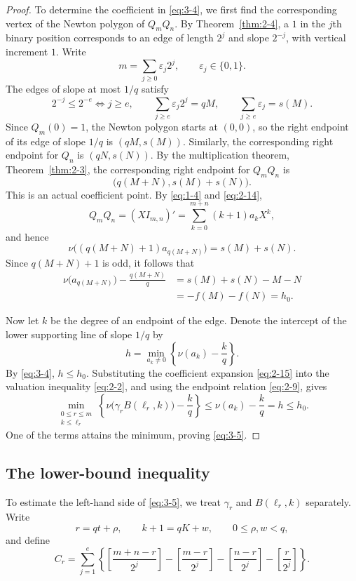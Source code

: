 \documentclass[11pt,a4paper]{article}
\numberwithin{equation}{section}
\theoremstyle{definition}
\begin{document}
\begin{proof}
To determine the coefficient in \eqref{eq:3-4}, we first find the corresponding vertex of the Newton polygon of $Q_mQ_n$. By Theorem~\ref{thm:2-4}, a $1$ in the $j$th binary position corresponds to an edge of length $2^j$ and slope $2^{-j}$, with vertical increment $1$. Write
\[
m=\sum_{j\ge0}\varepsilon_j2^j,\qquad\varepsilon_j\in\{0,1\}.
\]
The edges of slope at most $1/q$ satisfy
\[
2^{-j}\le2^{-e}\iff j\ge e,\qquad
\sum_{j\ge e}\varepsilon_j2^j=qM,\qquad
\sum_{j\ge e}\varepsilon_j=s(M).
\]
Since $Q_m(0)=1$, the Newton polygon starts at $(0,0)$, so the right endpoint of its edge of slope $1/q$ is $(qM,s(M))$. Similarly, the corresponding right endpoint for $Q_n$ is $(qN,s(N))$. By the multiplication theorem, Theorem~\ref{thm:2-3}, the corresponding right endpoint for $Q_mQ_n$ is
\[
\bigl(q(M+N),s(M)+s(N)\bigr).
\]
This is an actual coefficient point. By \eqref{eq:1-4} and \eqref{eq:2-14},
\[
Q_mQ_n=(XI_{m,n})'=\sum_{k=0}^{m+n}(k+1)a_kX^k,
\]
and hence
\[
\nu\bigl((q(M+N)+1)a_{q(M+N)}\bigr)=s(M)+s(N).
\]
Since $q(M+N)+1$ is odd, it follows that
\[
\begin{aligned}
\nu\bigl(a_{q(M+N)}\bigr)-\frac{q(M+N)}q
&=s(M)+s(N)-M-N\\
&=-f(M)-f(N)=h_0.
\end{aligned}
\]

Now let $k$ be the degree of an endpoint of the edge. Denote the intercept of the lower supporting line of slope $1/q$ by
\[
h=\min_{a_k\ne0}\left\{\nu(a_k)-\frac{k}{q}\right\}.
\]
By \eqref{eq:3-4}, $h\le h_0$. Substituting the coefficient expansion \eqref{eq:2-15} into the valuation inequality \eqref{eq:2-2}, and using the endpoint relation \eqref{eq:2-9}, gives
\[
\min_{\substack{0\le r\le m\\k\le\ell_r}}
\left\{\nu\bigl(\gamma_rB(\ell_r,k)\bigr)-\frac{k}{q}\right\}
\le\nu(a_k)-\frac{k}{q}=h\le h_0.
\]
One of the terms attains the minimum, proving \eqref{eq:3-5}.
\end{proof}

\subsection{The lower-bound inequality}

To estimate the left-hand side of \eqref{eq:3-5}, we treat $\gamma_r$ and $B(\ell_r,k)$ separately. Write
\begin{equation}
r=qt+\rho,\qquad k+1=qK+w,\qquad0\le\rho,w<q,
\label{eq:3-6}
\end{equation}
and define
\begin{equation}
C_r=\sum_{j=1}^e\left\{
\left[\frac{m+n-r}{2^j}\right]
-\left[\frac{m-r}{2^j}\right]
-\left[\frac{n-r}{2^j}\right]
-\left[\frac{r}{2^j}\right]\right\}.
\label{eq:3-7}
\end{equation}
\end{document}
